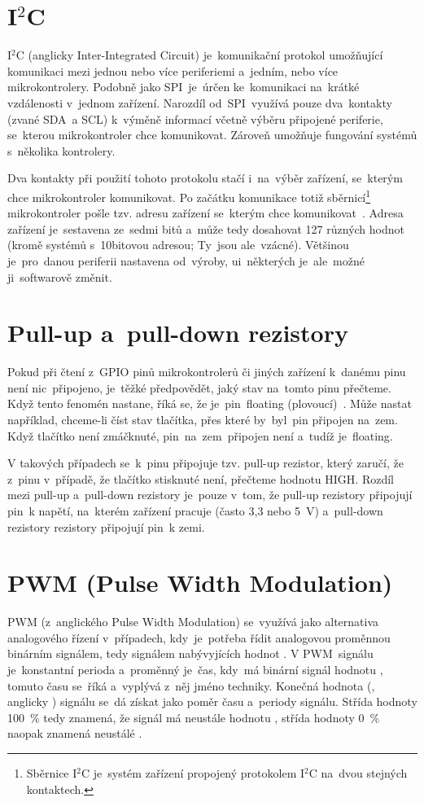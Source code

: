 \section{I$^{2}$C}
I$^{2}$C (anglicky Inter-Integrated Circuit) je~komunikační protokol umožňující komunikaci mezi jednou nebo více periferiemi a~jedním, nebo více mikrokontrolery.
Podobně jako SPI~je~úrčen ke~komunikaci na~krátké vzdálenosti v~jednom zařízení.
Narozdíl od~SPI~využívá pouze dva~kontakty (zvané SDA~a SCL) k~výměně informací včetně výběru připojené periferie, se~kterou mikrokontroler chce komunikovat.
Zároveň umožňuje fungování systémů s~několika kontrolery.~\cite{sparkfun-i2c}

Dva kontakty při použití tohoto protokolu stačí i~na~výběr zařízení, se~kterým chce mikrokontroler komunikovat.
Po začátku komunikace totiž sběrnicí\footnote{Sběrnice I$^{2}$C je~systém zařízení propojený protokolem I$^{2}$C na~dvou stejných kontaktech.} mikrokontroler pošle tzv. adresu zařízení se~kterým chce komunikovat~\cite{sparkfun-i2c}.
Adresa zařízení je~sestavena ze~sedmi bitů a~může tedy dosahovat 127 různých hodnot (kromě systémů s~10bitovou adresou; Ty~jsou ale~vzácné).
Většinou je~pro~danou periferii nastavena od~výroby, ui~některých je~ale~možné ji~softwarově změnit.

\section{Pull-up a~pull-down rezistory}
Pokud při čtení z~GPIO pinů mikrokontrolerů či jiných zařízení k~danému pinu není nic~připojeno, je~těžké předpovědět, jaký stav na~tomto pinu přečteme.
Když tento fenomén nastane, říká se, že je~pin~floating (plovoucí)~\cite{sparkfun-pud}.
Může nastat například, chceme-li číst stav tlačítka, přes které by~byl~pin připojen na~zem. Když tlačítko není zmáčknuté, pin~na~zem~připojen není a~tudíž je~floating.

V takových případech se~k~pinu připojuje tzv. pull-up rezistor, který zaručí, že z~pinu v~případě, že tlačítko stisknuté není, přečteme hodnotu HIGH.
Rozdíl mezi pull-up a~pull-down rezistory je~pouze v~tom, že pull-up rezistory připojují pin~k napětí, na~kterém zařízení pracuje (často 3,3 nebo 5~V) a~pull-down rezistory rezistory připojují pin~k zemi.~\cite{sparkfun-pud}

\section{PWM (Pulse Width Modulation)}\label{sec:pwm}
PWM (z~anglického Pulse Width Modulation) se~využívá jako alternativa analogového řízení v~případech, kdy~je~potřeba řídit analogovou proměnnou binárním signálem, tedy signálem nabývyjících hodnot .
V PWM~signálu je~konstantní perioda a~proměnný je~čas, kdy~má binární signál hodnotu , tomuto času se~říká  a~vyplývá z~něj jméno techniky. Konečná hodnota (, anglicky ) signálu se~dá získat jako poměr času  a~periody signálu.
Střída hodnoty 100~\% tedy znamená, že signál má neustále hodnotu , střída hodnoty 0~\% naopak znamená neustálé .~\cite{pwm}\cite{wiki_pwm}

